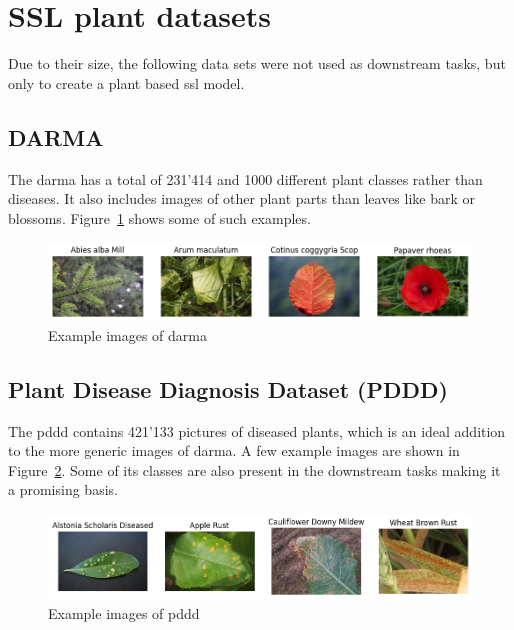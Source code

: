 \section{SSL plant datasets}

Due to their size, the following data sets were not used as downstream tasks, but only to create a plant based \gls{ssl} model. 
\subsection{DARMA}
The \gls{darma} has a total of 231'414 and 1000 different plant classes rather than diseases. It also includes images of other plant parts than leaves like bark or blossoms. Figure~\ref{fig:example_images_of_darma} shows some of such examples.

\begin{figure}[H]
    \begin{center}
    \includegraphics[width=15cm]{../images/example_images_of_darma.png}
    \caption{Example images of \gls{darma}}\label{fig:example_images_of_darma}
    \end{center}
\end{figure}

\subsection{Plant Disease Diagnosis Dataset (PDDD)}
The \gls{pddd} contains 421'133 pictures of diseased plants, which is an ideal addition to the more generic images of \gls{darma}.
A few example images are shown in Figure~\ref{fig:example_images_of_pddd}. Some of its classes are also present in the downstream tasks making it a promising basis.
\begin{figure}[H]
    \begin{center}
    \includegraphics[width=15cm]{../images/example_images_of_pddd.png}
    \caption{Example images of \gls{pddd}}\label{fig:example_images_of_pddd}
    \end{center}
\end{figure}

